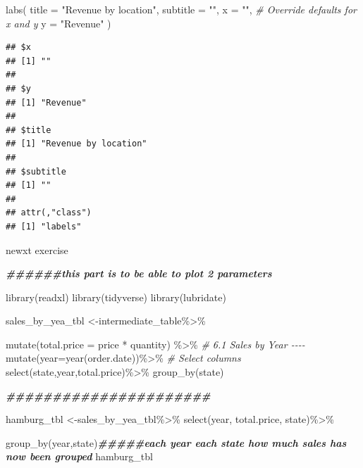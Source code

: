 \documentclass[
]{article}
\newenvironment{Shaded}{\begin{snugshade}}{\end{snugshade}}
\newcommand{\AttributeTok}[1]{\textcolor[rgb]{0.77,0.63,0.00}{#1}}
\newcommand{\CommentTok}[1]{\textcolor[rgb]{0.56,0.35,0.01}{\textit{#1}}}
\newcommand{\DocumentationTok}[1]{\textcolor[rgb]{0.56,0.35,0.01}{\textbf{\textit{#1}}}}
\newcommand{\FunctionTok}[1]{\textcolor[rgb]{0.00,0.00,0.00}{#1}}
\newcommand{\NormalTok}[1]{#1}
\newcommand{\OtherTok}[1]{\textcolor[rgb]{0.56,0.35,0.01}{#1}}
\newcommand{\SpecialCharTok}[1]{\textcolor[rgb]{0.00,0.00,0.00}{#1}}
\newcommand{\StringTok}[1]{\textcolor[rgb]{0.31,0.60,0.02}{#1}}
\begin{document}
\begin{Shaded}
\begin{Highlighting}[]
  \FunctionTok{labs}\NormalTok{(}
    \AttributeTok{title    =} \StringTok{"Revenue by location"}\NormalTok{,}
    \AttributeTok{subtitle =} \StringTok{""}\NormalTok{,}
    \AttributeTok{x =} \StringTok{""}\NormalTok{, }\CommentTok{\# Override defaults for x and y}
    \AttributeTok{y =} \StringTok{"Revenue"}
\NormalTok{  )}
\end{Highlighting}
\end{Shaded}

\begin{verbatim}
## $x
## [1] ""
## 
## $y
## [1] "Revenue"
## 
## $title
## [1] "Revenue by location"
## 
## $subtitle
## [1] ""
## 
## attr(,"class")
## [1] "labels"
\end{verbatim}

newxt exercise

\begin{Shaded}
\begin{Highlighting}[]
\DocumentationTok{\#\#\#\#\#\#this part is to be able to plot 2 parameters}

\FunctionTok{library}\NormalTok{(readxl)}
\FunctionTok{library}\NormalTok{(tidyverse)}
\FunctionTok{library}\NormalTok{(lubridate)}

\NormalTok{sales\_by\_yea\_tbl }\OtherTok{\textless{}{-}}\NormalTok{intermediate\_table}\SpecialCharTok{\%\textgreater{}\%} 

  \FunctionTok{mutate}\NormalTok{(}\AttributeTok{total.price =}\NormalTok{ price }\SpecialCharTok{*}\NormalTok{ quantity) }\SpecialCharTok{\%\textgreater{}\%}
\CommentTok{\# 6.1 Sales by Year {-}{-}{-}{-}}
  \FunctionTok{mutate}\NormalTok{(}\AttributeTok{year=}\FunctionTok{year}\NormalTok{(order.date))}\SpecialCharTok{\%\textgreater{}\%}
  \CommentTok{\# Select columns}
  \FunctionTok{select}\NormalTok{(state,year,total.price)}\SpecialCharTok{\%\textgreater{}\%} 
  \FunctionTok{group\_by}\NormalTok{(state) }

\DocumentationTok{\#\#\#\#\#\#\#\#\#\#\#\#\#\#\#\#\#\#\#\#\#\#}

\NormalTok{ hamburg\_tbl }\OtherTok{\textless{}{-}}\NormalTok{sales\_by\_yea\_tbl}\SpecialCharTok{\%\textgreater{}\%}
  \FunctionTok{select}\NormalTok{(year, total.price, state)}\SpecialCharTok{\%\textgreater{}\%}
 
 \FunctionTok{group\_by}\NormalTok{(year,state)}\DocumentationTok{\#\#\#\#\#each year each state how much sales has now been grouped}
\NormalTok{hamburg\_tbl}
\end{Highlighting}
\end{Shaded}
\end{document}
